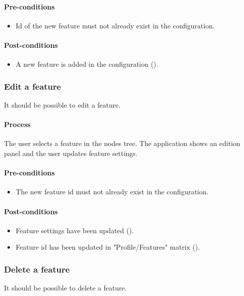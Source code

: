 \documentclass[11pt,a4paper,oneside]{article}
\begin{document}
\paragraph{Pre-conditions}
\begin{itemize}
	\item Id of the new feature must not already exist in the configuration.
\end{itemize}

\paragraph{Post-conditions}
\begin{itemize}
	\item A new feature is added in the configuration ().
\end{itemize}

\subsubsection{Edit a feature}
It should be possible to edit a feature.

\paragraph{Process}
The user selects a feature in the nodes tree. The application shows an edition panel and the user updates feature settings.

\paragraph{Pre-conditions}
\begin{itemize}
	\item The new feature id must not already exist in the configuration.
\end{itemize}

\paragraph{Post-conditions}
\begin{itemize}
	\item Feature settings have been updated ().
	\item Feature id has been updated in "Profile/Features" matrix ().
\end{itemize}

\subsubsection{Delete a feature}
It should be possible to delete a feature.
\end{document}
